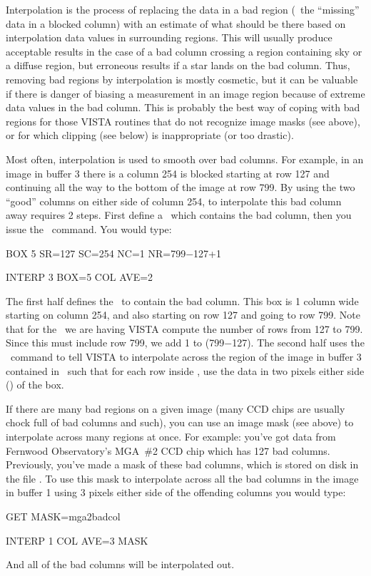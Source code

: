 
Interpolation is the process of replacing the data in a bad region (\eg\ the
``missing'' data in a blocked column) with an estimate of what should be there
based on interpolation data values in surrounding regions.  This will usually
produce acceptable results in the case of a bad column crossing a region
containing sky or a diffuse region, but erroneous results if a star lands on
the bad column.  Thus, removing bad regions by interpolation is mostly
cosmetic, but it can be valuable if there is danger of biasing a measurement
in an image region because of extreme data values in the bad column.  This is
probably the best way of coping with bad regions for those VISTA routines that
do not recognize image masks (see above), or for which clipping (see below) is
inappropriate (or too drastic). 

Most often, interpolation is used to smooth over bad columns.  For example, in
an image in buffer 3 there is a column 254 is blocked starting at row 127 and
continuing all the way to the bottom of the image at row 799.  By using the
two ``good'' columns on either side of column 254, to interpolate this
bad column away requires 2 steps.  First define a \ 
which contains the bad column, then you issue the \ 
command.  You would type:
\begin{command}
      \item BOX 5 SR=127 SC=254 NC=1 NR=799$-$127+1
      \item INTERP 3 BOX=5 COL AVE=2
\end{command}
The first half defines the \ to contain the bad column. This box
is 1 column wide starting on column 254, and also starting on row 127 and
going to row 799.  Note that for the \comm{NR=}\ we are having VISTA compute
the number of rows from 127 to 799.  Since this must include row 799, we add 1
to (799$-$127).  The second half uses the \comm{INTERP}\ command to tell VISTA
to interpolate across the region of the image in buffer 3 contained in
\comm{BOX=5}\ such that for each row inside \comm{BOX=5}, use the data in two
pixels either side (\comm{AVE=2}) of the box. 

If there are many bad regions on a given image (many CCD chips are usually
chock full of bad columns and such), you can use an image mask (see above) to
interpolate across many regions at once.  For example:  you've got data from
Fernwood Observatory's MGA~\#2 CCD chip which has 127 bad columns. Previously,
you've made a mask of these bad columns, which is stored on disk in the file
\comm{mga2badcol.msk}.  To use this mask to interpolate across all the bad
columns in the image in buffer 1 using 3 pixels either side of the offending
columns you would type: 
\begin{command}
      \item GET MASK=mga2badcol
      \item INTERP 1 COL AVE=3 MASK      
\end{command}
And all of the bad columns will be interpolated out.

